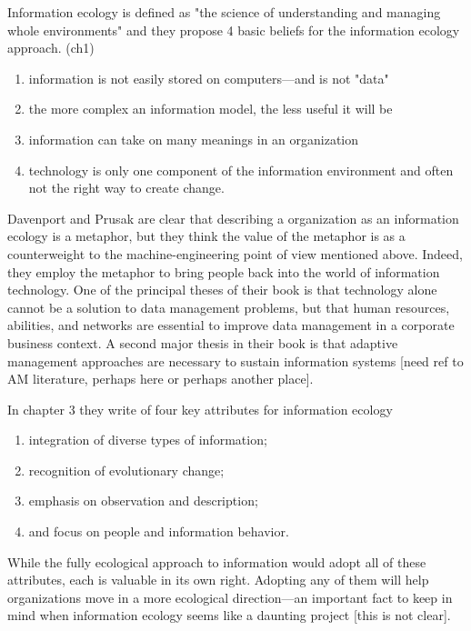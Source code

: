 Information ecology is defined as "the science of understanding and managing whole environments" and they propose 4 basic beliefs for the information ecology approach. (ch1)
\begin{enumerate}
\item information is not easily stored on computers—and is not "data"
\item the more complex an information model, the less useful it will be
\item information can take on many meanings in an organization
\item technology is only one component of the information environment and often not the right way to create change.
\end{enumerate}

Davenport and Prusak are clear that describing a organization as an information ecology is a metaphor, but they think the value of the metaphor is as a counterweight to the machine-engineering point of view mentioned above. Indeed, they employ the metaphor to bring people back into the world of information technology. One of the principal theses of their book is that technology alone cannot be a solution to data management problems, but that human resources, abilities, and networks are essential to improve data management in a corporate business context. A second major thesis in their book is that adaptive management approaches are necessary to sustain information systems [need ref to AM literature, perhaps here or perhaps another place].

In chapter 3 they write of four key attributes for information ecology

\begin{enumerate}
\item integration of diverse types of information;
\item recognition of evolutionary change;
\item emphasis on observation and description;
\item and focus on people and information behavior.
\end{enumerate}

While the fully ecological approach to information would adopt all of these attributes, each is valuable in its own right. Adopting any of them will help organizations move in a more ecological direction—an important fact to keep in mind when information ecology seems like a daunting project [this is not clear].


